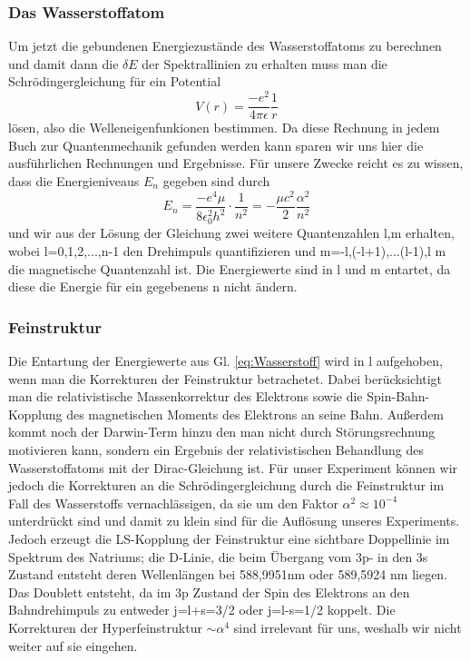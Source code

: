 \documentclass[]{article}
\begin{document}
\subsubsection{Das Wasserstoffatom}
Um jetzt die gebundenen Energiezustände des Wasserstoffatoms zu berechnen und damit dann die $\delta E$ der Spektrallinien zu erhalten muss man die Schrödingergleichung für ein Potential
\begin{equation}
	V(r)=\frac{-e^2}{4\pi \epsilon} \frac{1}{r}
\end{equation}
lösen, also die Welleneigenfunkionen bestimmen. Da diese Rechnung in jedem Buch zur Quantenmechanik gefunden werden kann sparen wir uns hier die ausführlichen Rechnungen und Ergebnisse. Für unsere Zwecke reicht es zu wissen, dass die Energieniveaus $E_{n}$ gegeben sind durch
\begin{equation}
\label{eq:Wasserstoff}
	E_{n}=\frac{-e^4\mu}{8\epsilon_0^2h^2}\cdot \frac{1}{n^2}=-\frac{\mu c^2}{2}\frac{\alpha^2}{n^2}
\end{equation} und wir aus der Lösung der Gleichung zwei weitere Quantenzahlen l,m erhalten, wobei l=0,1,2,...,n-1 den Drehimpuls quantifizieren und m=-l,(-l+1),...(l-1),l m die magnetische Quantenzahl ist. Die Energiewerte sind in l und m entartet, da diese die Energie für ein gegebenens n nicht ändern.
\subsubsection{Feinstruktur}
Die Entartung der Energiewerte aus Gl. \ref{eq:Wasserstoff} wird in l aufgehoben, wenn man die Korrekturen der Feinstruktur betrachetet. Dabei berücksichtigt man die relativistische Massenkorrektur des Elektrons sowie die Spin-Bahn-Kopplung des magnetischen Moments des Elektrons an seine Bahn. Außerdem kommt noch der Darwin-Term hinzu den man nicht durch Störungsrechnung motivieren kann, sondern ein Ergebnis der relativistischen Behandlung des Wasserstoffatoms mit der Dirac-Gleichung ist. 
Für unser Experiment können wir jedoch die Korrekturen an die Schrödingergleichung durch die Feinstruktur im Fall des Wasserstoffs vernachlässigen, da sie um den Faktor $\alpha^2 \approx  10^{-4}$ unterdrückt sind und damit zu klein sind für die Auflösung unseres Experiments. Jedoch erzeugt die LS-Kopplung der Feinstruktur eine sichtbare Doppellinie im Spektrum des Natriums; die D-Linie, die beim Übergang vom 3p- in den 3s Zustand entsteht deren Wellenlängen bei 588,9951nm oder  589,5924 nm liegen. Das Doublett entsteht, da im 3p Zustand der Spin des Elektrons an den Bahndrehimpuls zu entweder j=l+s=3/2 oder j=l-s=1/2 koppelt. 
Die Korrekturen der Hyperfeinstruktur $\sim \alpha^4$ sind irrelevant für uns, weshalb wir nicht weiter auf sie eingehen.
\end{document}
